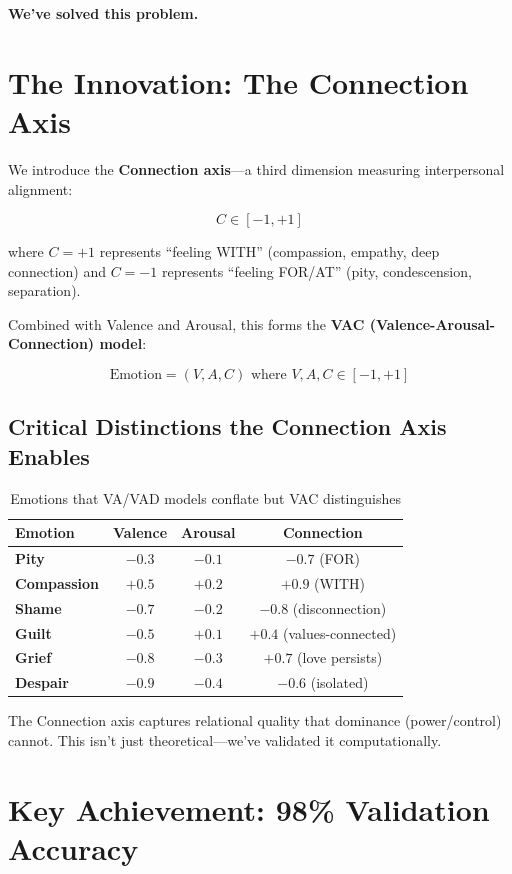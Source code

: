 \documentclass[11pt]{article}
\begin{document}
\textbf{We've solved this problem.}

\section{The Innovation: The Connection Axis}

We introduce the \textbf{Connection axis}—a third dimension measuring interpersonal alignment:

$$C \in [-1, +1]$$

where $C = +1$ represents ``feeling WITH'' (compassion, empathy, deep connection) and $C = -1$ represents ``feeling FOR/AT'' (pity, condescension, separation).

Combined with Valence and Arousal, this forms the \textbf{VAC (Valence-Arousal-Connection) model}:

$$\text{Emotion} = (V, A, C) \text{ where } V, A, C \in [-1, +1]$$

\subsection{Critical Distinctions the Connection Axis Enables}

\begin{table}[h]
\centering
\caption{Emotions that VA/VAD models conflate but VAC distinguishes}
\small
\begin{tabular}{lccc}
\toprule
\textbf{Emotion} & \textbf{Valence} & \textbf{Arousal} & \textbf{Connection} \\
\midrule
\textbf{Pity} & $-0.3$ & $-0.1$ & \textbf{$-0.7$} (FOR) \\
\textbf{Compassion} & $+0.5$ & $+0.2$ & \textbf{$+0.9$} (WITH) \\
\midrule
\textbf{Shame} & $-0.7$ & $-0.2$ & \textbf{$-0.8$} (disconnection) \\
\textbf{Guilt} & $-0.5$ & $+0.1$ & \textbf{$+0.4$} (values-connected) \\
\midrule
\textbf{Grief} & $-0.8$ & $-0.3$ & \textbf{$+0.7$} (love persists) \\
\textbf{Despair} & $-0.9$ & $-0.4$ & \textbf{$-0.6$} (isolated) \\
\bottomrule
\end{tabular}
\end{table}

The Connection axis captures relational quality that dominance (power/control) cannot. This isn't just theoretical—we've validated it computationally.

\section{Key Achievement: 98\% Validation Accuracy}
\end{document}
